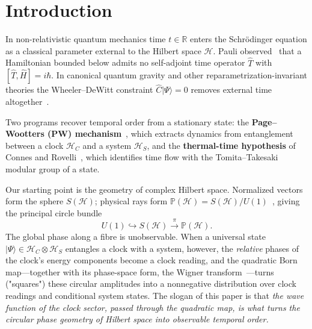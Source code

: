 \documentclass[aps,prd,onecolumn,notitlepage,10pt,amsmath,amssymb,amsfonts,nofootinbib]{revtex4-2}
\theoremstyle{definition}
\theoremstyle{remark}
\newcommand{\Hil}{\mathcal{H}}
\newcommand{\Cop}{\widehat{C}}
\newcommand{\R}{\mathbb{R}}
\begin{document}
\maketitle

\section{Introduction}
\label{sec:intro}

In non-relativistic quantum mechanics time $t\in\R$ enters the Schr\"odinger equation as a classical parameter external to the Hilbert space $\Hil$. Pauli observed~\cite{Pauli1933} that a Hamiltonian bounded below admits no self-adjoint time operator $\widehat T$ with $[\widehat T,\widehat H]=i\hbar$. In canonical quantum gravity and other reparametrization-invariant theories the Wheeler--DeWitt constraint $\Cop|\Psi\rangle=0$ removes external time altogether~\cite{DeWitt1967,Kuchar1992}.

Two programs recover temporal order from a stationary state: the \textbf{Page--Wootters (PW) mechanism}~\cite{PageWootters1983,Giovannetti2015}, which extracts dynamics from entanglement between a clock $\Hil_C$ and a system $\Hil_S$, and the \textbf{thermal-time hypothesis} of Connes and Rovelli~\cite{ConnesRovelli1994}, which identifies time flow with the Tomita--Takesaki modular group of a state.

Our starting point is the geometry of complex Hilbert space. Normalized vectors form the sphere $S(\Hil)$; physical rays form $\mathbb{P}(\Hil)=S(\Hil)/U(1)$~\cite{Kibble1979,Ashtekar1999}, giving the principal circle bundle
\begin{equation}
  U(1)\hookrightarrow S(\Hil)\xrightarrow{\ \pi\ }\mathbb{P}(\Hil).
  \label{eq:hopf}
\end{equation}
The global phase along a fibre is unobservable. When a universal state $|\Psi\rangle\in\Hil_C\otimes\Hil_S$ entangles a clock with a system, however, the \emph{relative} phases of the clock's energy components become a clock reading, and the quadratic Born map---together with its phase-space form, the Wigner transform~\cite{Wigner1932}---turns ("squares") these circular amplitudes into a nonnegative distribution over clock readings and conditional system states. The slogan of this paper is that \emph{the wave function of the clock sector, passed through the quadratic map, is what turns the circular phase geometry of Hilbert space into observable temporal order.}
\end{document}
